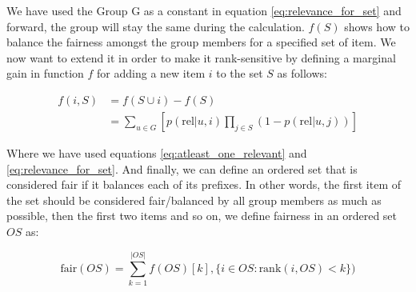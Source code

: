 We have used the Group G as a constant in equation \ref{eq:relevance_for_set} and forward, the group will stay the same during the calculation. $f(S)$ shows how to balance the fairness amongst the group members for a specified set of item. We now want to extend it in order to make it rank-sensitive by defining a marginal gain in function $f$ for adding a new item $i$ to the set $S$ as follows:

\begin{equation} \label{eq:relevance_for_set}
\begin{aligned}
    f(i, S) &= f(S \cup {i}) - f(S) \\
    & = \sum_{u \in G}{\left[p(\textrm{rel}|u, i) \prod_{j \in S}{(1 - p(\textrm{rel}|u, j))}\right]}
\end{aligned}
\end{equation}

Where we have used equations \ref{eq:atleast_one_relevant} and \ref{eq:relevance_for_set}. And finally, we can define an ordered set that is considered fair if it balances each of its prefixes. In other words, the first item of the set should be considered fair/balanced by all group members as much as possible, then the first two items and so on, we define fairness in an ordered set $OS$ as:

\begin{equation}
    \textrm{fair}(OS) = \sum_{k=1}^{|OS|}{f(OS)[k], \{i \in OS : \textrm{rank}(i, OS) < k\})}
\end{equation}


